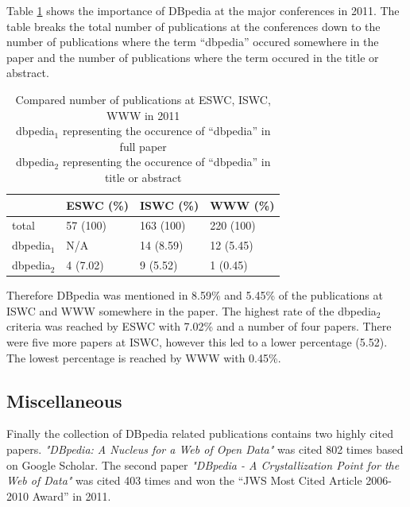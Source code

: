 \documentclass[english]{lni}
\begin{document}
   Table \ref{tab:vergleich} shows the importance of DBpedia at the major
   conferences in 2011. The table breaks the total number of publications at the
   conferences down to the number of publications where the term ``dbpedia''
   occured somewhere in the paper and the number of publications where the term
   occured in the title or abstract.

\begin{table}[htb]
\caption{\centering Compared number of publications at ESWC, ISWC, WWW in 2011 \\\hspace{0.4cm}dbpedia$_{1}$ representing the occurence of ``dbpedia'' in full paper \\\hspace{1.05cm}dbpedia$_{2}$ representing the occurence of ``dbpedia'' in title or abstract} \label{tab:vergleich}
\begin{center}
\begin{tabular}{llll}
\hline
                &  ESWC (\%)  &  ISWC (\%)  &  WWW (\%)   \\
\hline
 total          &  57 (100)   &  163 (100)  &  220 (100)  \\
 dbpedia$_{1}$  &  N/A        &  14 (8.59)  &  12 (5.45)  \\
 dbpedia$_{2}$  &  4 (7.02)   &  9 (5.52)   &  1 (0.45)   \\
\hline
\end{tabular}
\end{center}
\end{table}


   Therefore DBpedia was mentioned in 8.59\% and 5.45\% of the publications at
   ISWC and WWW somewhere in the paper. The highest rate of the dbpedia$_{2}$
   criteria was reached by ESWC with 7.02\% and a number of four papers. There
   were five more papers at ISWC, however this led to a lower percentage
   (5.52). The lowest percentage is reached by WWW with 0.45\%.
\subsection{Miscellaneous}
\label{sec-3-4}

   Finally the collection of DBpedia related publications contains two highly
   cited papers. \textit{"DBpedia: A Nucleus for a Web of Open Data"} \cite{auer2007dbpedia} was cited 802
   times based on Google Scholar. The second paper \textit{"DBpedia - A Crystallization
   Point for the Web of Data"} \cite{bizer2009dbpedia} was cited 403 times and won the ``JWS Most Cited
   Article 2006-2010 Award'' in 2011.
\end{document}

